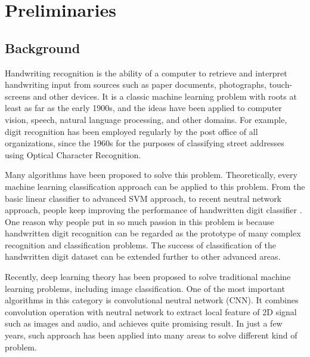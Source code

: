 
\section{Preliminaries}
\label{Preliminaries}

\subsection{Background}
Handwriting recognition is the ability of a computer to retrieve and interpret handwriting input from sources such as paper documents, photographs, touch-screens and other devices. It is a classic machine learning problem  \cite{chen2014big}\cite{nair2015massively} with roots at least as far as the early 1900s, and the ideas have been applied to computer vision, speech, natural language processing, and other domains. For example, digit recognition has been employed regularly by the post office of all organizations, since the 1960s for the purposes of classifying street addresses using Optical Character Recognition.

Many algorithms have been proposed to solve this problem. Theoretically, every machine learning classification approach can be applied to this problem. From the basic linear classifier to advanced SVM approach, to recent neutral network approach, people keep improving the performance of handwritten digit classifier  \cite{peterson1989new}. One reason why people put in so much passion in this problem is because handwritten digit recognition can be regarded as the prototype of many complex recognition and classification problems. The success of classification of the handwritten digit dataset can be extended further to other advanced areas.

Recently, deep learning \cite{glorot2011domain}\cite{barrett2006researching} theory has been proposed to solve traditional machine learning problems, including image classification. One of the most important algorithms in this category is convolutional neutral network (CNN). It combines convolution operation with neutral network to extract local feature of 2D signal such as images and audio, and achieves quite promising result. In just a few years, such approach has been applied into many areas to solve different kind of problem.


